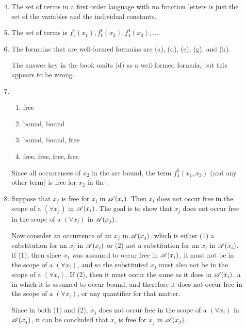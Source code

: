 \solutions{}

\begin{enumerate}
  \setcounter{enumi}{3}
  \item %
    The set of terms in a first order language with no function letters is just the set of the variables and the individual constants.

  \item %
    The set of terms is \(f^1_1(x_1), f^1_1(x_2), f^1_1(x_3), \dots\).

  \item %
    The formulas that are well-formed formulas are (a), (d), (e), (g), and (h).

    \note{} The answer key in the book omits (d) as a well-formed formula, but this appears to be wrong.

  \item %
    \begin{enumerate}[label = (\alph*), align = left]
      \item free
      \item bound, bound
      \item bound, bound, free
      \item free, free, free, free
    \end{enumerate}

    Since all occurrences of \(x_2\) in the \wfs{} are bound, the term \(f^2_1(x_1, x_3)\) (and any other term) is free for \(x_2\) in the \wfs{}.

  \item %
    Suppose that \(x_j\) is free for \(x_i\) in \(\mathscr{A}(x_i)\). Then \(x_i\) does not occur free in the scope of a \((\forall x_j)\) in \(\mathscr{A}(x_i)\). The goal is to show that \(x_j\) does not occur free in the scope of a \((\forall x_i)\) in \(\mathscr{A}(x_j)\).

    Now consider an occurrence of an \(x_j\) in \(\mathscr{A}(x_j)\), which is either (1) a substitution for an \(x_i\) in \(\mathscr{A}(x_i)\) or (2) not a substitution for an \(x_i\) in \(\mathscr{A}(x_i)\). If (1), then since \(x_1\) was assumed to occur free in \(\mathscr{A}(x_i)\), it must not be in the scope of a \((\forall x_i)\), and so the substituted \(x_j\) must also not be in the scope of a \((\forall x_i)\). If (2), then it must occur the same as it does in \(\mathscr{A}(x_i)\), a \wf{} in which it is assumed to occur bound, and therefore it does not occur free in the scope of a \((\forall x_i)\), or any quantifier for that matter.

    Since in both (1) and (2), \(x_j\) does not occur free in the scope of a \((\forall x_i)\) in \(\mathscr{A}(x_j)\), it can be concluded that \(x_i\) is free for \(x_j\) in \(\mathscr{A}(x_j)\).


\end{enumerate}
